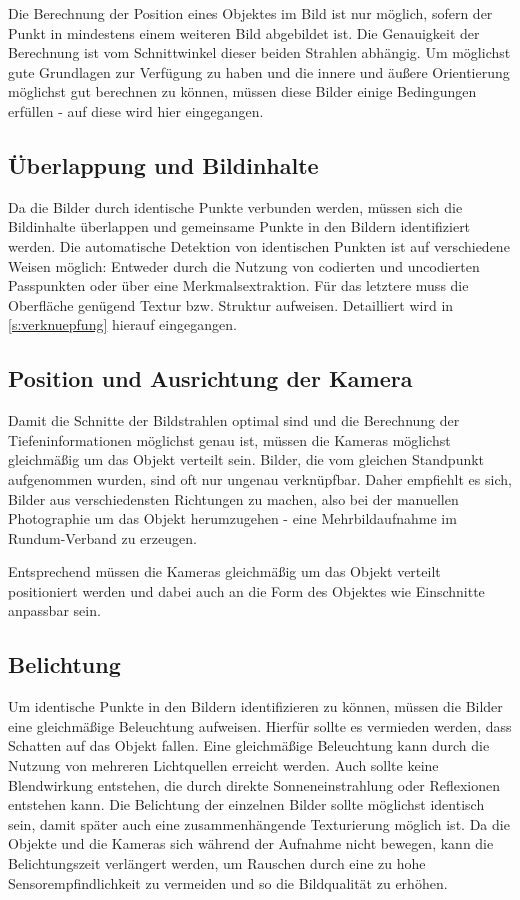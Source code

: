 \documentclass[./00PhotoBox.tex]{subfiles}
\begin{document}
Die Berechnung der Position eines Objektes im Bild ist nur möglich, sofern der Punkt in mindestens einem weiteren Bild abgebildet ist. Die Genauigkeit der Berechnung ist vom Schnittwinkel dieser beiden Strahlen abhängig. Um möglichst gute Grundlagen zur Ver\-fügung zu haben und die innere und äußere Orientierung möglichst gut berechnen zu können, müssen diese Bilder einige Bedingungen erfüllen - auf diese wird hier eingegangen.

\subsection{Überlappung und Bildinhalte}
Da die Bilder durch identische Punkte verbunden werden, müssen sich die Bildinhalte überlappen und gemeinsame Punkte in den Bildern identifiziert werden. Die automatische Detektion von identischen Punkten ist auf verschiedene Weisen möglich: Entweder durch die Nutzung von codierten und uncodierten Passpunkten oder über eine Merkmalsextraktion. Für das letztere muss die Oberfläche genügend Textur bzw. Struktur aufweisen. Detailliert wird in \autoref{s:verknuepfung} hierauf eingegangen. \citep[S. 478]{luhmann}

\subsection{Position und Ausrichtung der Kamera}
Damit die Schnitte der Bildstrahlen optimal sind und die Berechnung der Tiefeninformationen möglichst genau ist, müssen die Kameras möglichst gleichmäßig um das Objekt verteilt sein.
Bilder, die vom gleichen Standpunkt aufgenommen wurden, sind oft nur ungenau verknüpfbar. Daher empfiehlt es sich, Bilder aus verschiedensten Richtungen zu machen, also bei der manuellen Photographie um das Objekt herumzugehen - eine Mehrbildaufnahme im Rundum-Verband zu erzeugen. \citep[S. 170]{luhmann}

Entsprechend müssen die Kameras gleichmäßig um das Objekt verteilt positioniert werden und dabei auch an die Form des Objektes wie Einschnitte anpassbar sein.

\subsection{Belichtung}
Um identische Punkte in den Bildern identifizieren zu können, müssen die Bilder eine gleichmäßige Beleuchtung aufweisen. Hierfür sollte es vermieden werden, dass Schatten auf das Objekt fallen. Eine gleichmäßige Beleuchtung kann durch die Nutzung von mehreren Lichtquellen erreicht werden. Auch sollte keine Blendwirkung entstehen, die durch direkte Sonneneinstrahlung oder Reflexionen entstehen kann. Die Belichtung der einzelnen Bilder sollte möglichst identisch sein, damit später auch eine zusammenhängende Texturierung möglich ist.
Da die Objekte und die Kameras sich während der Aufnahme nicht bewegen, kann die Belichtungszeit verlängert werden, um Rauschen durch eine zu hohe Sensorempfindlichkeit zu vermeiden und so die Bildqualität zu erhöhen.
\end{document}
